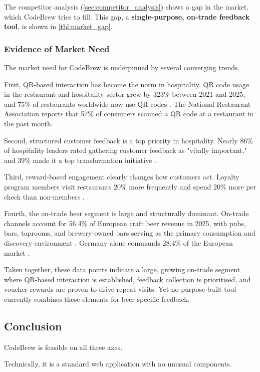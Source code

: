 \documentclass[a4paper,12pt]{article}
\begin{document}
The competitor analysis (\autoref{sec:competitor_analysis}) shows a gap in the market, which CodeBrew tries to fill.
This gap, a \textbf{single-purpose, on-trade feedback tool}, is shown in \autoref{tbl:market_gap}.

\subsubsection{Evidence of Market Need}
\label{sec:market_need}

The market need for CodeBrew is underpinned by several converging trends.
\bigbreak

First, QR-based interaction has become the norm in hospitality.
QR code usage in the restaurant and hospitality sector grew by 323\% between 2021 and 2025, and 75\% of restaurants worldwide now use QR codes \cite{qrTiger2025}.
The National Restaurant Association \cite{nra2025} reports that 57\% of consumers scanned a QR code at a restaurant in the past month.
\bigbreak

Second, structured customer feedback is a top priority in hospitality.
Nearly 86\% of hospitality leaders rated gathering customer feedback as "vitally important," and 39\% made it a top transformation initiative \cite{metrigy2024}.
\bigbreak

Third, reward-based engagement clearly changes how customers act.
Loyalty program members visit restaurants 20\% more frequently and spend 20\% more per check than non-members \cite{restroworks2025}.
\bigbreak

Fourth, the on-trade beer segment is large and structurally dominant.
On-trade channels account for 56.4\% of European craft beer revenue in 2025, with pubs, bars, taprooms, and brewery-owned bars serving as the primary consumption and discovery environment \cite{imarc2025}.
Germany alone commands 28.4\% of the European market \cite{imarc2025}.
\bigbreak

Taken together, these data points indicate a large, growing on-trade segment where QR-based interaction is established, feedback collection is prioritised, and voucher rewards are proven to drive repeat visits.
Yet no purpose-built tool currently combines these elements for beer-specific feedback.

\subsection{Conclusion}
CodeBrew is feasible on all three axes.

Technically, it is a standard web application with no unusual components.
\end{document}
